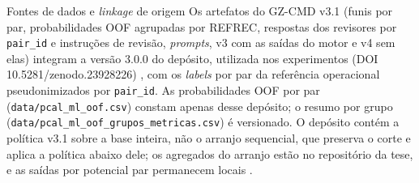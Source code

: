 \begin{chapter}{Fontes de dados e \textit{linkage} de origem}
Os artefatos do GZ-CMD v3.1 (funis por par, probabilidades OOF agrupadas por REFREC, respostas dos revisores por \texttt{pair\_id} e instruções de revisão, \textit{prompts}, v3 com as saídas do motor e v4 sem elas) integram a versão 3.0.0 do depósito, utilizada nos experimentos (DOI 10.5281/zenodo.23928226) \cite{Jardim2026zenodoGzcmd}, com os \textit{labels} por par da referência operacional pseudonimizados por \texttt{pair\_id}. As probabilidades OOF por par (\texttt{data/pcal\_ml\_oof.csv}) constam apenas desse depósito; o resumo por grupo (\texttt{data/\allowbreak pcal\_\allowbreak ml\_\allowbreak oof\_\allowbreak grupos\_\allowbreak metricas.csv}) é versionado. O depósito contém a política v3.1 sobre a base inteira, não o arranjo sequencial, que preserva o corte e aplica a política abaixo dele; os agregados do arranjo estão no repositório da tese, e as saídas por potencial par permanecem locais \cite{Jardim2026phdrepo}.

\end{chapter}
